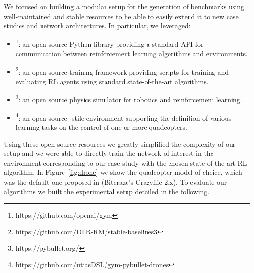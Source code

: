 We focused on building a modular setup for the generation of benchmarks using well-maintained
and stable resources to be able to easily extend it to new case studies and network 
architectures. In particular, we leveraged:
%
\begin{itemize}
	\item \gym\footnote{https://github.com/openai/gym}: an open source Python 
	library providing a standard API for communication between reinforcement 
	learning algorithms and environments.
	\item \stableb\footnote{https://github.com/DLR-RM/stable-baselines3}: an 
	open source training framework providing scripts for training and evaluating 
	RL agents using standard state-of-the-art algorithms.
	\item \pybullet\footnote{https://pybullet.org/}: an open source physics 
	simulator for robotics and reinforcement learning.
	\item \drones\footnote{https://github.com/utiasDSL/gym-pybullet-drones}: an 
	open source \gym-stile environment supporting the definition of various 
	learning tasks on the control of one or more quadcopters.
\end{itemize}
%
Using these open source resources we greatly simplified the complexity of our 
setup and we were able to directly train the network of interest in the environment 
corresponding to our case study with the chosen state-of-the-art RL algorithm.
In Figure~\ref{fig:drone} we show the quadcopter model of choice,
which was the default one proposed in \drones{} (Bitcraze's Crazyflie 2.x).
To evaluate our algorithms we built the experimental setup detailed in the following.
%
